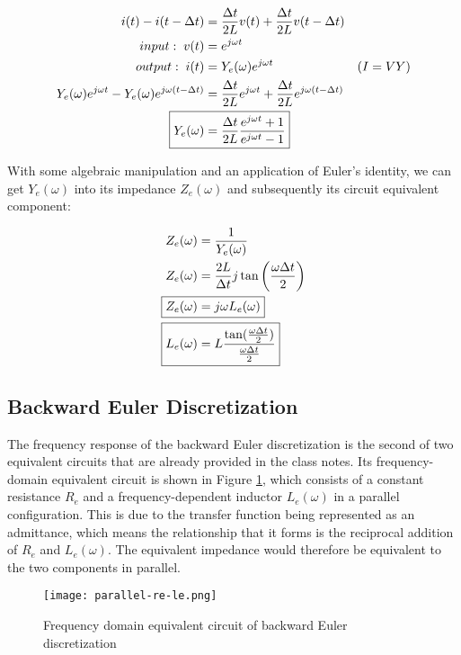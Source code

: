 \documentclass[10pt, oneside, letterpaper]{article}
\begin{document}
\begin{alignat}{2}
i(t) - i(t-\Delta{}t) &= \frac{\Delta{}t}{2L}v(t) + \frac{\Delta{}t}{2L}v(t - \Delta{}t) \\
input:\;v(t) &= e^{j\omega{}t} \\
output:\;i(t) &= Y_e{}(\omega)e^{j\omega{}t} & (I = VY)\\
Y_e{}(\omega)e^{j\omega{}t} - Y_e{}(\omega)e^{j\omega{}(t-\Delta{}t)} &= \frac{\Delta{}t}{2L}e^{j\omega{}t} + \frac{\Delta{}t}{2L}e^{j\omega{}(t-\Delta{}t)} \\
\Aboxed{Y_e{}(\omega) &= \frac{\Delta{}t}{2L}\frac{e^{j\omega{}t} + 1}{e^{j\omega{}t} - 1}}
\end{alignat}

With some algebraic manipulation and an application of Euler's identity, we can get $Y_e{}(\omega)$ into its impedance $Z_e{}(\omega)$ and subsequently its circuit equivalent component:

\begin{alignat}{2}
Z_e{}(\omega) &= \frac{1}{Y_e{}(\omega)} \\
Z_e{}(\omega) &= \frac{2L}{\Delta{}t}j\tan\left(\frac{\omega{}\Delta{}t}{2}\right) \\
\Aboxed{Z_e{}(\omega) &= j\omega{}L_e{}(\omega)} \\
\Aboxed{L_e{}(\omega) &= L\frac{\tan(\frac{\omega{}\Delta{}t}{2})}{\frac{\omega{}\Delta{}t}{2}}}
\end{alignat}

\subsection{Backward Euler Discretization}

The frequency response of the backward Euler discretization is the second of two equivalent circuits that are already provided in the class notes. Its frequency-domain equivalent circuit is shown in Figure \ref{back-euler-circuit}, which consists of a constant resistance $R_e$ and a frequency-dependent inductor $L_e(\omega{})$ in a parallel configuration. This is due to the transfer function being represented as an admittance, which means the relationship that it forms is the reciprocal addition of $R_e$ and $L_e(\omega{})$. The equivalent impedance would therefore be equivalent to the two components in parallel.

\begin{figure}[H]
  \centering
  \texttt{[image: parallel-re-le.png]}
  \caption{Frequency domain equivalent circuit of backward Euler discretization}
  \label{back-euler-circuit}
\end{figure}
\end{document}
